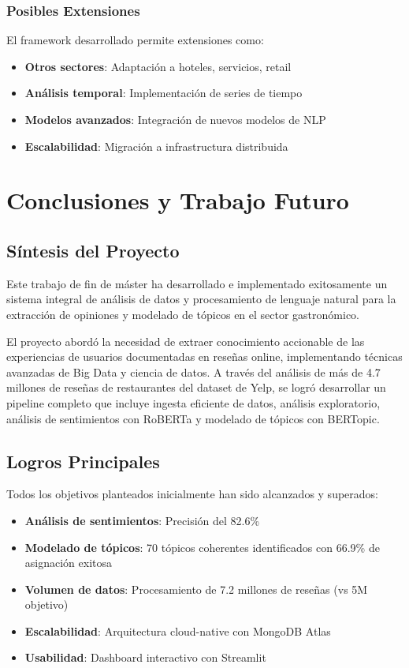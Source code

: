 \documentclass[12pt,a4paper,twoside,openany]{book}
\begin{document}
\subsection{Posibles Extensiones}

El framework desarrollado permite extensiones como:

\begin{itemize}
    \item \textbf{Otros sectores}: Adaptación a hoteles, servicios, retail
    \item \textbf{Análisis temporal}: Implementación de series de tiempo
    \item \textbf{Modelos avanzados}: Integración de nuevos modelos de NLP
    \item \textbf{Escalabilidad}: Migración a infrastructura distribuida
\end{itemize}

\chapter{Conclusiones y Trabajo Futuro}

\section{Síntesis del Proyecto}

Este trabajo de fin de máster ha desarrollado e implementado exitosamente un sistema integral de análisis de datos y procesamiento de lenguaje natural para la extracción de opiniones y modelado de tópicos en el sector gastronómico.

El proyecto abordó la necesidad de extraer conocimiento accionable de las experiencias de usuarios documentadas en reseñas online, implementando técnicas avanzadas de Big Data y ciencia de datos. A través del análisis de más de 4.7 millones de reseñas de restaurantes del dataset de Yelp, se logró desarrollar un pipeline completo que incluye ingesta eficiente de datos, análisis exploratorio, análisis de sentimientos con RoBERTa y modelado de tópicos con BERTopic.

\section{Logros Principales}

Todos los objetivos planteados inicialmente han sido alcanzados y superados:

\begin{itemize}
    \item \textbf{Análisis de sentimientos}: Precisión del 82.6\%
    \item \textbf{Modelado de tópicos}: 70 tópicos coherentes identificados con 66.9\% de asignación exitosa
    \item \textbf{Volumen de datos}: Procesamiento de 7.2 millones de reseñas (vs 5M objetivo)
    \item \textbf{Escalabilidad}: Arquitectura cloud-native con MongoDB Atlas
    \item \textbf{Usabilidad}: Dashboard interactivo con Streamlit
\end{itemize}
\end{document}
